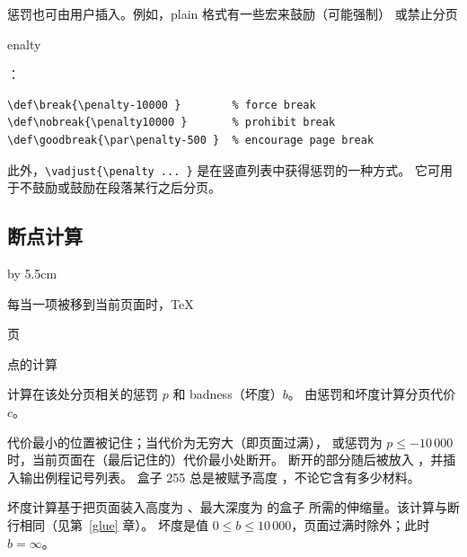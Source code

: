 \documentclass[a4paper]{rapport3}
\makeatletter
\def\term#1\par{\index{#1}}
\def\cstoidx#1\par{\index{#1@\cs{#1}}}
\makeatother
\begin{document}
惩罚也可由用户插入。例如，plain 格式有一些宏来鼓励（可能强制）
或禁止分页\cstoidx penalty\par：
\begin{verbatim}
\def\break{\penalty-10000 }        % force break
\def\nobreak{\penalty10000 }       % prohibit break
\def\goodbreak{\par\penalty-500 }  % encourage page break
\end{verbatim}
此外，\verb>\vadjust{\penalty ... }> 是在竖直列表中获得惩罚的一种方式。
它可用于不鼓励或鼓励在段落某行之后分页。

\subsection{断点计算}

\advance\rightskip by 5.5cm

每当一项被移到当前页面时，\TeX\
\term 分页\par\term 断点的计算\par
{}
计算在该处分页相关的惩罚 $p$ 和 badness（坏度）$b$。
由惩罚和坏度计算分页代价 $c$。

代价最小的位置被记住；当代价为无穷大（即页面过满），
或惩罚为 $p\leq-10\,000$ 时，当前页面在（最后记住的）代价最小处断开。
断开的部分随后被放入 ，并插入输出例程记号列表。
盒子 255 总是被赋予高度 ，不论它含有多少材料。

坏度计算基于把页面装入高度为 、最大深度为  的盒子
所需的伸缩量。该计算与断行相同（见第~\ref{glue} 章）。
坏度是值 $0\leq b\leq 10\,000$，页面过满时除外；此时~$b=\infty$。
\end{document}
